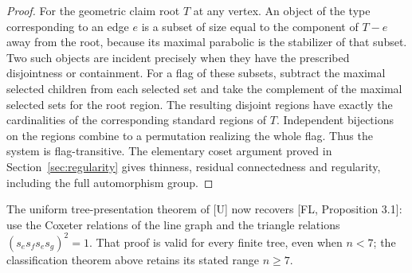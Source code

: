 \begin{proof}
For the geometric claim root $T$ at any vertex. An object of the type
corresponding to an edge $e$ is a subset of size equal to the component
of $T-e$ away from the root, because its maximal parabolic is the
stabilizer of that subset. Two such objects are incident precisely when
they have the prescribed disjointness or containment. For a flag of
these subsets, subtract the maximal selected children from each selected
set and take the complement of the maximal selected sets for the root
region. The resulting disjoint regions have exactly the cardinalities
of the corresponding standard regions of $T$. Independent bijections
on the regions combine to a permutation realizing the whole flag.
Thus the system is flag-transitive. The elementary coset argument
proved in Section~\ref{sec:regularity} gives thinness, residual
connectedness and regularity, including the full automorphism group.
\end{proof}
The uniform tree-presentation theorem of [U] now recovers
[FL, Proposition 3.1]: use the Coxeter relations of the line graph
and the triangle relations $(s_es_fs_es_g)^2=1$.
That proof is valid for every finite tree, even when $n<7$; the
classification theorem above retains its stated range $n\geq7$.
